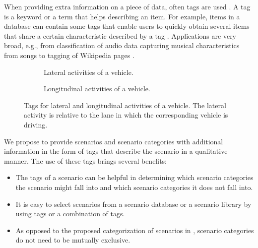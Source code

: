 When providing extra information on a piece of data, often tags are used \cite{smith2007tagging}. A tag is a keyword or a term that helps describing an item. For example, items in a database can contain some tags that enable users to quickly obtain several items that share a certain characteristic described by a tag \cite{craft2004tagging, vasquez2019controlling}. Applications are very broad, e.g., from classification of audio data \cite{kong2017joint} capturing musical characteristics from songs \cite{ellis2011semantic} to tagging of Wikipedia pages \cite{voss2006collaborative}.

\begin{figure}
	\centering
	\begin{subfigure}{\linewidth}
		\centering
		\caption{Lateral activities of a vehicle.\vspace{1em}}
		\label{fig:tree vehicle lat act}
	\end{subfigure}
	\begin{subfigure}{\linewidth}
		\centering
		\caption{Longitudinal activities of a vehicle.}
		\label{fig:tree vehicle long act}
	\end{subfigure}
	\caption{Tags for lateral and longitudinal activities of a vehicle. The lateral activity is relative to the lane in which the corresponding vehicle is driving.}
	\label{fig:tree vehicle activities}
\end{figure}

\cbstartc We propose to provide scenarios and scenario categories with additional information in the form of tags that describe the scenario in a qualitative manner.
\cbend
The use of these tags brings several benefits:
\begin{itemize}
	\item \cbstartd The tags of a scenario can be helpful in determining which scenario categories the scenario might fall into and which scenario categories it does not fall into.\cbend
	\item It is easy to select scenarios from a scenario database or a scenario library by using tags or a combination of tags.
	\item As opposed to the proposed categorization of scenarios in \cite{opdencamp2014cats, USDoT2007precrashscenarios, lenard2014typical, lara2019harmonized}, scenario categories do not need to be mutually exclusive.
\end{itemize}

